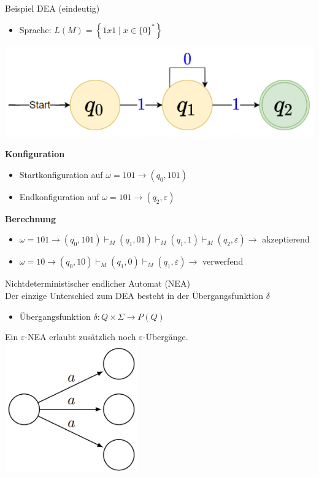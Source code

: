 \begin{example2}{Beispiel DEA (eindeutig)}
    \begin{itemize}
    \item Sprache: $L(M)=\left\{1 x 1 \mid x \in\{0\}^{*}\right\}$
    \end{itemize}
    \includegraphics[width=0.5\linewidth]{images/dea_example.png}

    \textbf{Konfiguration}
    \begin{itemize}
    \item Startkonfiguration auf $\omega=101 \rightarrow\left(q_{0}, 101\right)$
    \item Endkonfiguration auf $\omega=101 \rightarrow\left(q_{2}, \varepsilon\right)$
    \end{itemize}

    \textbf{Berechnung}
    \begin{itemize}
    \item $\omega=101 \rightarrow\left(q_{0}, 101\right) \vdash_{M}\left(q_{1}, 01\right) \vdash_{M}\left(q_{1}, 1\right) \vdash_{M}\left(q_{2}, \varepsilon\right) \rightarrow$ akzeptierend
    \item $\omega=10 \rightarrow\left(q_{0}, 10\right) \vdash_{M}\left(q_{1}, 0\right) \vdash_{M}\left(q_{1}, \varepsilon\right) \rightarrow$ verwerfend
    \end{itemize}
\end{example2}

\begin{definition}{Nichtdeterministischer endlicher Automat (NEA)}\\
    Der einzige Unterschied zum DEA besteht in der Übergangsfunktion $\delta$
    \begin{itemize}
    \item Übergangsfunktion $\delta: Q \times \Sigma \rightarrow P(Q)$
    \end{itemize}
    Ein $\varepsilon$-NEA erlaubt zusätzlich noch $\varepsilon$-Übergänge.\\
    \includegraphics[width=0.2\linewidth]{images/ndea.png}
\end{definition}


